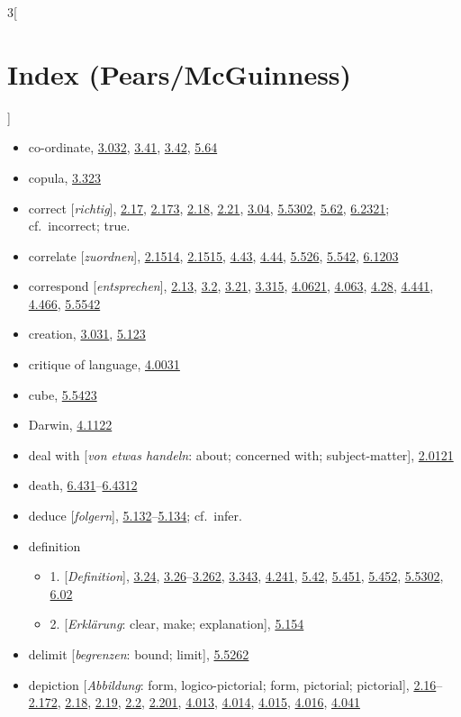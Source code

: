 \documentclass[oneside,openany,12pt]{book}
\newcommand{\indexentry}[1]{\item #1}
\newcommand{\indexsubentry}[1]{\begin{itemize} \item #1 \end{itemize}}
\newcommand{\indexref}[1]{\hyperlink{prop#1}{#1}}
\newcommand{\indexgap}{\bigskip}
\begin{document}
\begin{multicols}{3}[\section*{Index (Pears/McGuinness)}]
\begin{itemize}
\indexentry{co-ordinate, \indexref{3.032}, \indexref{3.41}, \indexref{3.42}, \indexref{5.64}}

\indexentry{copula, \indexref{3.323}}

\indexentry{correct [\textit{richtig}], \indexref{2.17}, \indexref{2.173}, \indexref{2.18}, \indexref{2.21}, \indexref{3.04}, \indexref{5.5302}, \indexref{5.62}, \indexref{6.2321}; cf.\ incorrect; true.}

\indexentry{correlate [\textit{zuordnen}], \indexref{2.1514}, \indexref{2.1515}, \indexref{4.43}, \indexref{4.44}, \indexref{5.526}, \indexref{5.542}, \indexref{6.1203}}

\indexentry{correspond [\textit{entsprechen}], \indexref{2.13}, \indexref{3.2}, \indexref{3.21}, \indexref{3.315}, \indexref{4.0621}, \indexref{4.063}, \indexref{4.28}, \indexref{4.441}, \indexref{4.466}, \indexref{5.5542}}

\indexentry{creation, \indexref{3.031}, \indexref{5.123}}

\indexentry{critique of language, \indexref{4.0031}}

\indexentry{cube, \indexref{5.5423}}

\indexgap

\indexentry{Darwin, \indexref{4.1122}}

\indexentry{deal with [\textit{von etwas handeln}: about; concerned with; subject-matter], \indexref{2.0121}}

\indexentry{death, \indexref{6.431}--\indexref{6.4312}}

\indexentry{deduce [\textit{folgern}], \indexref{5.132}--\indexref{5.134}; cf.\ infer.}

\indexentry{definition}

   \indexsubentry{1. [\textit{Definition}], \indexref{3.24}, \indexref{3.26}--\indexref{3.262}, \indexref{3.343}, \indexref{4.241}, \indexref{5.42}, \indexref{5.451}, \indexref{5.452}, \indexref{5.5302}, \indexref{6.02}}

   \indexsubentry{2. [\textit{Erkl{\"a}rung}: clear, make; explanation], \indexref{5.154}}

\indexentry{delimit [\textit{begrenzen}: bound; limit], \indexref{5.5262}}

\indexentry{depiction [\textit{Abbildung}: form, logico-pictorial; form, pictorial; pictorial], \indexref{2.16}--\indexref{2.172}, \indexref{2.18}, \indexref{2.19}, \indexref{2.2}, \indexref{2.201}, \indexref{4.013}, \indexref{4.014}, \indexref{4.015}, \indexref{4.016}, \indexref{4.041}}


\end{itemize}
\end{multicols}
\end{document}
